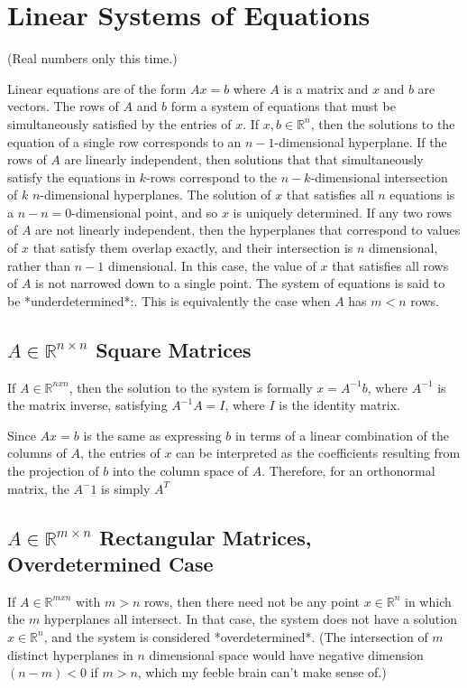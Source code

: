 \section{Linear Systems of Equations}
\label{sec:linearequations}

(Real numbers only this time.)

Linear equations are of the form $Ax = b$ where $A$ is a matrix and $x$ and $b$ are vectors. The rows of $A$ and $b$ form a system of equations that must be simultaneously satisfied by the entries of $x$. If $x,b\in\mathbb{R}^n$, then the solutions to the equation of a single row corresponds to an $n-1$-dimensional hyperplane. If the rows of $A$ are linearly independent, then solutions that that simultaneously satisfy the equations in $k$-rows correspond to the $n-k$-dimensional intersection of $k$ $n$-dimensional hyperplanes. The solution of $x$ that satisfies all $n$ equations is a $n-n = 0$-dimensional point, and so $x$ is uniquely determined. If any two rows of $A$ are not linearly independent, then the hyperplanes that correspond to values of $x$ that satisfy them overlap exactly, and their intersection is $n$ dimensional, rather than $n-1$ dimensional. In this case, the value of $x$ that satisfies all rows of $A$ is not narrowed down to a single point. The system of equations is said to be *underdetermined*:. This is equivalently the case when $A$ has $m<n$ rows.  

\subsection{$A\in\mathbb{R}^{n\times n}$ Square Matrices}
If $A\in\mathbb{R}^{nxn}$, then the solution to the system is formally $x = A^{-1}b$, where $A^{-1}$ is the matrix inverse, satisfying $A^{-1}A=I$, where $I$ is the identity matrix. 

Since $Ax=b$ is the same as expressing $b$ in terms of a linear combination of the columns of $A$, the entries of $x$ can be interpreted as the coefficients resulting from the projection of $b$ into the column space of $A$. Therefore, for an orthonormal matrix, the $A^-1$ is simply $A^T$ 

\subsection{$A\in\mathbb{R}^{m\times n}$ Rectangular Matrices, Overdetermined Case}
If $A\in\mathbb{R}^{mxn}$ with $m>n$ rows, then there need not be any point $x\in\mathbb{R}^n$ in which the $m$ hyperplanes all intersect. In that case, the system does not have a solution $x\in\mathbb{R}^n$, and the system is considered *overdetermined*. (The intersection of $m$ distinct hyperplanes in $n$ dimensional space would have negative dimension $(n-m)<0$ if $m>n$, which my feeble brain can't make sense of.)
\\

